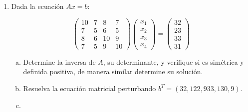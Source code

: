 \documentclass[
	spanish,
	9pt,
	utf8,
	xcolor=table,
	handout,
	aspectratio=1610,
	professionalfonts,
	notheorems,
	mathserif,
]{beamer}
\newcounter{savedenum}
\newcommand*{\resume}{\setcounter{enumi}{\thesavedenum}}
\begin{document}
\begin{frame}
	\begin{enumerate}
		\resume

		\item
		      Dada la ecuación $Ax=b$:

		      \begin{equation*}
			      \begin{pmatrix}
				      10 & 7 & 8  & 7  \\
				      7  & 5 & 6  & 5  \\
				      8  & 6 & 10 & 9  \\
				      7  & 5 & 9  & 10
			      \end{pmatrix}
			      \begin{pmatrix}
				      x_{1} \\
				      x_{2} \\
				      x_{3} \\
				      x_{4}
			      \end{pmatrix}=
			      \begin{pmatrix}
				      32 \\
				      23 \\
				      33 \\
				      31
			      \end{pmatrix}
		      \end{equation*}

		      \begin{enumerate}[a)]
			      \item

			            Determine la inversa de $A$, su determinante, y verifique si es simétrica y definida positiva, de
			            manera similar determine su solución.

			      \item

			            Resuelva la ecuación matricial perturbando $b^{T}=\left(32,122,933,130,9\right)$.

			      \item


\end{enumerate}
\end{enumerate}
\end{frame}
\end{document}
